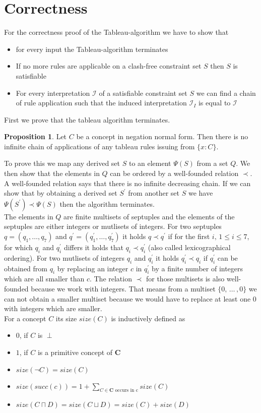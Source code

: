 \documentclass[a4paper,11pt]{scrartcl}
\theoremstyle{break}
\theoremstyle{definition}
\newtheorem{mypro}{Proposition}
\begin{document}
\section{Correctness}
For the correctness proof of the Tableau-algorithm we have to show that
\begin{itemize}
\item for every input the Tableau-algorithm terminates
\item If no more rules are applicable on a clash-free constraint set $S$ then $S$ is satisfiable
\item For every interpretation $\mathcal{I}$ of a satisfiable constraint set $S$ we can find a chain of rule application such that the induced interpretation $\mathcal{I}_I$ is equal to $\mathcal{I}$
\end{itemize}
First we prove that the tableau algorithm terminates. 
\begin{mypro}
Let $C$ be a concept in negation normal form. Then there is no infinite chain of applications of any tableau rules issuing from $\{x:C\}$. 
\end{mypro}
To prove this we map any derived set $S$ to an element $\Psi(S)$ from a set $Q$. We then show that the elements in $Q$ can be ordered by a well-founded relation $\prec$. A well-founded relation says that there is no infinite decreasing chain. If we can show that by obtaining a derived set $S^\prime$ from another set $S$ we have $\Psi(S^\prime)\prec\Psi(S)$ then the algorithm terminates.\\
The elements in $Q$ are finite multisets of septuples and the elements of the septuples are either integers or mutlisets of integers. For two septuples $q=(q_1,\dots,q_7)$ and $q^\prime=(q^\prime_1,\dots,q^\prime_7)$ it holds $q\prec q^\prime$ if for the first $i,\, 1\leq i\leq 7$, for which $q_i$ and $q_i^\prime$ differs it holds that $q_i\prec q_i^\prime$ (also called lexicographical ordering). For two mutlisets of integers $q_i$ and $q_i^\prime$ it holds $q_i^\prime\prec q_i$ if $q_i^\prime$ can be obtained from $q_i$ by replacing an integer $c$ in $q_i^\prime$ by a finite number of integers which are all smaller than $c$. The relation $\prec$ for those multisets is also well-founded because we work with integers. That means from a multiset $\{0,\,\dots\,,0\}$ we can not obtain a smaller multiset because we would have to replace at least one $0$ with integers which are smaller.\\
For a concept $C$ its size $size(C)$ is inductively defined as
\begin{itemize}
\item $0$, if $C$ is $\perp$
\item $1$, if $C$ is a primitive concept of $\mathbf{C}$
\item $size(\neg C)=size(C)$
\item $size(succ(c))= 1 + \sum_{C\in\mathbf{C}\text{ occurs in c}} size(C)$
\item $size(C\sqcap D)=size(C\sqcup D)=size(C)+size(D)$
\end{itemize}
\end{document}
